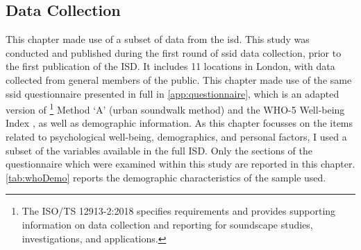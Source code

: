\subsection{Data Collection}
This chapter made use of a subset of data from the \gls{isd}. This study was conducted and published during the first round of \gls{ssid} data collection, prior to the first publication of the ISD. It includes 11 locations in London, with data collected from general members of the public. This chapter made use of the same \gls{ssid} questionnaire presented in full in \cref{app:questionnaire}, which is an adapted version of \citet{ISO12913Part2}\footnote{The ISO/TS 12913-2:2018 specifies requirements and provides supporting information on data collection and reporting for soundscape studies, investigations, and applications.} Method `A' (urban soundwalk method) and the WHO-5 Well-being Index \citep{Hall2011Examining}, as well as demographic information. As this chapter focusses on the items related to psychological well-being, demographics, and personal factors, I used a subset of the variables available in the full ISD. Only the sections of the questionnaire which were examined within this study are reported in this chapter. \cref{tab:whoDemo} reports the demographic characteristics of the sample used.


